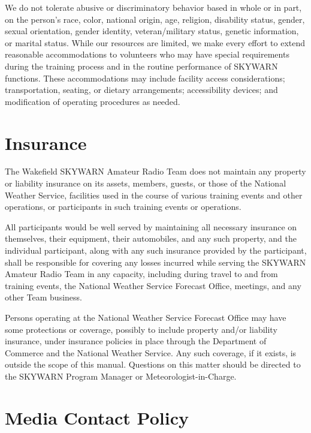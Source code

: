 \documentclass[pdflatex,letterpaper,twoside,12pt]{book}
\begin{document}
We do not tolerate abusive or discriminatory behavior based in whole or in part, on the person's race, color, national origin, age, religion, disability status, gender, sexual orientation, gender identity, veteran/military status, genetic information, or marital status. While our resources are limited, we make every effort to extend reasonable accommodations to volunteers who may have special requirements during the training process and in the routine performance of SKYWARN functions. These accommodations may include facility access considerations; transportation, seating, or dietary arrangements; accessibility devices; and modification of operating procedures as needed.


\section{Insurance}

The Wakefield SKYWARN Amateur Radio Team does not maintain any property or liability insurance on its assets, members, guests, or those of the National Weather Service, facilities used in the course of various training events and other operations, or participants in such training events or operations. 

All participants would be well served by maintaining all necessary insurance on themselves, their equipment, their automobiles, and any such property, and the individual participant, along with any such insurance provided by the participant, shall be responsible for covering any losses incurred while serving the SKYWARN Amateur Radio Team in any capacity, including during travel to and from training events, the National Weather Service Forecast Office, meetings, and any other Team business. 

Persons operating at the National Weather Service Forecast Office may have some protections or coverage, possibly to include property and/or liability insurance, under insurance policies in place through the Department of Commerce and the National Weather Service.  Any such coverage, if it exists, is outside the scope of this manual.  Questions on this matter should be directed to the SKYWARN Program Manager or Meteorologist-in-Charge.


\section{Media Contact Policy}
\end{document}
